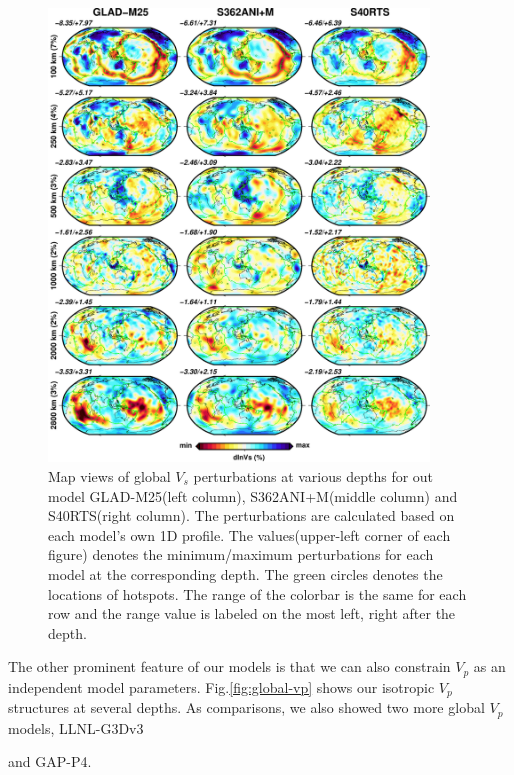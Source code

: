 \documentclass[extra,mreferee]{gji}
\begin{document}
{\begin{figure}
  \centering
  \includegraphics[width=0.9\textwidth]{figures/depth_slice/globe_vs.pdf}
  \caption{Map views of global $V_s$ perturbations at various depths for out model
  GLAD-M25(left column), S362ANI+M(middle column)\citep{moulik2014anisotropic}
  and S40RTS(right column)\citep{ritsema2011s40rts}. The perturbations are
  calculated based on each model's own 1D profile. The values(upper-left corner
  of each figure) denotes the minimum/maximum perturbations for each model at
  the corresponding depth. The green circles denotes the locations of
  hotspots\citep{montelli2006catalogue}. The range of the colorbar is the same
  for each row and the range value is labeled on the most left, right after
  the depth.}
  \label{fig:global-vs}
\end{figure}


The other prominent feature of our models is that we can also constrain $V_p$ as an
independent model parameters. Fig.\ref{fig:global-vp} shows our isotropic $V_p$
structures at several depths. As comparisons, we also showed two more global
$V_p$ models, LLNL-G3Dv3\citep{simmons2012llnl}} and GAP-P4\citep{fukao2013subducted}.
\end{document}
